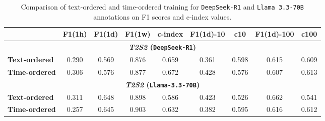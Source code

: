 \begin{table}[htbp]
\caption{Comparison of text-ordered and time-ordered training for \texttt{DeepSeek-R1} and \texttt{Llama 3.3-70B} annotations on F1 scores and c-index values. 
}
\ChSevenTableBodyStart
\begin{ChSevenFloatBody}

\centering
{
\begin{adjustbox}{max width=\linewidth}
\begin{tabular}{lcccccccc}
\toprule
& F1(1h) & F1(1d) & F1(1w) & c-index & F1(1d)-10 & c10 & F1(1d)-100 & c100 \\
\hline
\multicolumn{9}{c}{\textbf{\textit{T2S2} (\texttt{DeepSeek-R1})}} \\
\hline
\textbf{Text-ordered} & 0.290 & 0.569 & 0.876 & 0.659 & 0.361 & 0.598 & 0.615 & 0.609 \\
\textbf{Time-ordered} & 0.306 & 0.576 & 0.877 & 0.672 & 0.428 & 0.576 & 0.607 & 0.613 \\
\hline
\multicolumn{9}{c}{\textbf{\textit{T2S2} (\texttt{Llama-3.3-70B})}} \\
\hline
\textbf{Text-ordered} & 0.311 & 0.648 & 0.898 & 0.586 & 0.423 & 0.526 & 0.662 & 0.541 \\
\textbf{Time-ordered} & 0.257 & 0.645 & 0.903 & 0.632 & 0.382 & 0.595 & 0.616 & 0.612 \\
\bottomrule
\end{tabular}
\end{adjustbox}
}



\end{ChSevenFloatBody}
\end{table}